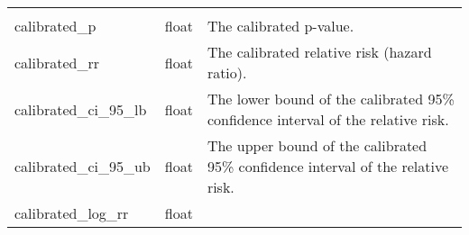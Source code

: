 \documentclass[
]{article}
\begin{document}
\begin{longtable}[]{@{}lll@{}}
\begin{minipage}[t]{0.50\columnwidth}
\end{minipage}\tabularnewline
\begin{minipage}[t]{0.23\columnwidth}\raggedright
calibrated\_p\strut
\end{minipage} & \begin{minipage}[t]{0.18\columnwidth}\raggedright
float\strut
\end{minipage} & \begin{minipage}[t]{0.50\columnwidth}\raggedright
The calibrated p-value.\strut
\end{minipage}\tabularnewline
\begin{minipage}[t]{0.23\columnwidth}\raggedright
calibrated\_rr\strut
\end{minipage} & \begin{minipage}[t]{0.18\columnwidth}\raggedright
float\strut
\end{minipage} & \begin{minipage}[t]{0.50\columnwidth}\raggedright
The calibrated relative risk (hazard ratio).\strut
\end{minipage}\tabularnewline
\begin{minipage}[t]{0.23\columnwidth}\raggedright
calibrated\_ci\_95\_lb\strut
\end{minipage} & \begin{minipage}[t]{0.18\columnwidth}\raggedright
float\strut
\end{minipage} & \begin{minipage}[t]{0.50\columnwidth}\raggedright
The lower bound of the calibrated 95\% confidence interval of the
relative risk.\strut
\end{minipage}\tabularnewline
\begin{minipage}[t]{0.23\columnwidth}\raggedright
calibrated\_ci\_95\_ub\strut
\end{minipage} & \begin{minipage}[t]{0.18\columnwidth}\raggedright
float\strut
\end{minipage} & \begin{minipage}[t]{0.50\columnwidth}\raggedright
The upper bound of the calibrated 95\% confidence interval of the
relative risk.\strut
\end{minipage}\tabularnewline
\begin{minipage}[t]{0.23\columnwidth}\raggedright
calibrated\_log\_rr\strut
\end{minipage} & \begin{minipage}[t]{0.18\columnwidth}\raggedright
float\strut
\end{minipage} & \begin{minipage}[t]{0.50\columnwidth}\raggedright

\end{minipage}
\end{longtable}
\end{document}
